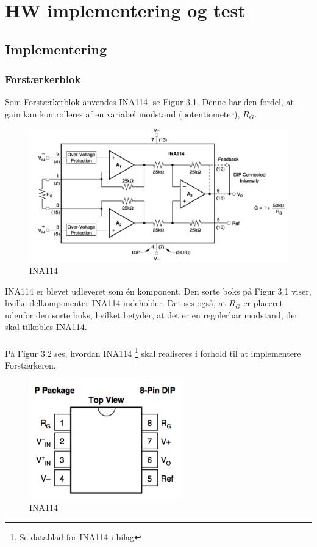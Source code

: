 \chapter{HW implementering og test}

\section{Implementering}

\subsection{Forstærkerblok}
Som Forstærkerblok anvendes INA114, se Figur 3.1. Denne har den fordel, at gain kan kontrolleres af en variabel modstand (potentiometer), $R_{G}$. 

\begin{figure}[H]
	\centering
	\includegraphics[width=1\textwidth]{Figurer/Snip20151117_104}
	\caption{INA114}
\end{figure}

INA114 er blevet udleveret som én komponent. Den sorte boks på Figur 3.1 viser, hvilke delkomponenter INA114 indeholder. Det ses også, at $R_{G}$ er placeret udenfor den sorte boks, hvilket betyder, at det er en regulerbar modstand, der skal tilkobles INA114.  
\\
\\
På Figur 3.2 ses, hvordan INA114 \footnote{Se datablad for INA114 i bilag} skal realiseres i forhold til at implementere Forstærkeren. 

\begin{figure}[H]
	\centering
	\includegraphics[width=0.6\textwidth]{Figurer/Snip20151207_47}
	\caption{INA114}
\end{figure}

